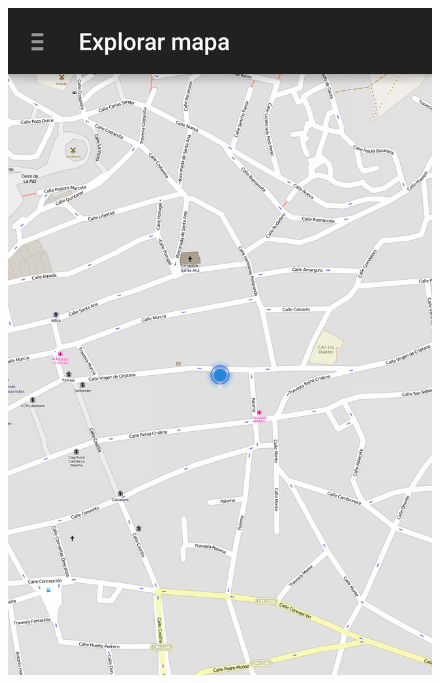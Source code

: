 \begin{slide}
  \begin{center}
    \begin{minipage}[b]{0.4\linewidth}
      \begin{center}
        \begin{figure}
          \includegraphics[height=0.65\textheight]{img/naviganto-ini.png}
        \end{figure}
      \end{center}
    \end{minipage}
    \begin{minipage}[b]{0.4\linewidth}
      \begin{center}
        \begin{figure}

\end{figure}
\end{center}
\end{minipage}
\end{center}
\end{slide}
